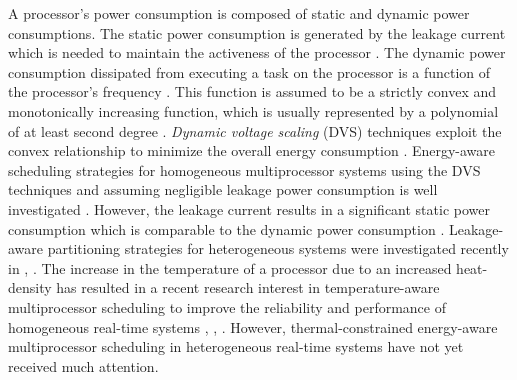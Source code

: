 \documentclass[conference]{IEEEtran}
\begin{document}
A processor's power consumption is composed of static and dynamic power consumptions. The static power consumption is
generated by the leakage current which is needed to maintain the activeness of the processor \cite{Chen09}. The dynamic power
consumption dissipated from executing a task on the processor
is a function of the processor's frequency \cite{Aydin03}. This function is assumed to be a strictly convex and monotonically increasing function,
which is usually represented by a polynomial of at least second degree \cite{Chen05}.
\emph{Dynamic voltage scaling} (DVS) techniques exploit the convex relationship to minimize the overall energy consumption \cite{Hong98}.
Energy-aware scheduling strategies for homogeneous multiprocessor systems using the DVS techniques and assuming negligible
leakage power consumption is well investigated  \cite{Chen07}.
However, the leakage current results in a significant static power consumption which is comparable to the dynamic power consumption \cite{Langen06}.
Leakage-aware partitioning strategies for heterogeneous systems were investigated recently in \cite{Chen09}, \cite{Langen09}.
The increase in the temperature of a processor due to an increased heat-density
has resulted in a recent
research interest in temperature-aware multiprocessor scheduling
to improve the reliability and performance of homogeneous real-time systems \cite{Chantem10}, \cite{Quan10}, \cite{Fisher09}.
However, thermal-constrained energy-aware multiprocessor scheduling in heterogeneous real-time systems have not yet received much attention.
\end{document}
